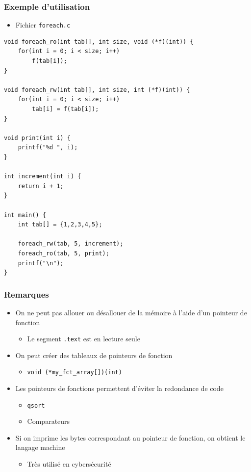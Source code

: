 \begin{frame}[containsverbatim]
\frametitle{Exemple d'utilisation}
\begin{itemize}
\item Fichier \texttt{foreach.c}
\end{itemize}
\begin{lstlisting}
void foreach_ro(int tab[], int size, void (*f)(int)) {
	for(int i = 0; i < size; i++)
		f(tab[i]);
}

void foreach_rw(int tab[], int size, int (*f)(int)) {
	for(int i = 0; i < size; i++)
		tab[i] = f(tab[i]);
}

void print(int i) {
	printf("%d ", i);
}

int increment(int i) {
	return i + 1;
}

int main() {
	int tab[] = {1,2,3,4,5};
	
	foreach_rw(tab, 5, increment);
	foreach_ro(tab, 5, print);
	printf("\n");
}
\end{lstlisting}
\end{frame}

\begin{frame}
\frametitle{Remarques}
\begin{itemize}[<+->]
\item On ne peut pas allouer ou désallouer de la mémoire à l'aide d'un pointeur de fonction
	\begin{itemize}
	\item Le segment \texttt{.text} est en lecture seule
	\end{itemize}
\item On peut créer des tableaux de pointeurs de fonction
	\begin{itemize}
	\item \lstinline|void (*my_fct_array[])(int)|
	\end{itemize}
\item Les pointeurs de fonctions permettent d'éviter la redondance de code
	\begin{itemize}
	\item \texttt{qsort}
	\item Comparateurs
	\end{itemize}
\item Si on imprime les bytes correspondant au pointeur de fonction, on obtient le langage machine
	\begin{itemize}
	\item Très utilisé en cybersécurité
	\end{itemize}
\end{itemize}
\end{frame}

